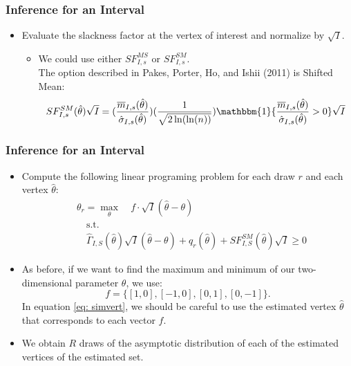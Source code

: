 \begin{frame}
\frametitle{Inference for an Interval}

\begin{itemize}
	\item Evaluate the slackness factor at the vertex of interest and normalize by $\sqrt{I}$.
	\begin{itemize}
		\item We could use either $SF^{MS}_{I,s}$ or $SF^{SM}_{I,s}$.\\
		The option described in Pakes, Porter, Ho, and Ishii (2011) is Shifted Mean:
		\begin{equation*}
		SF^{SM}_{I,s}(\hat{\theta})\sqrt{I} =(\frac{\overline{m}_{I,s}(\hat{\theta})}{\hat{\sigma}_{I,s}(\hat{\theta})})(\frac{1}{\sqrt{2\ln(\ln (n))}})\mathbbm{1}\{\frac{\overline{m}_{I,s}(\hat{\theta})}{\hat{\sigma}_{I,s}(\hat{\theta})}>0\}\sqrt{I}
		\end{equation*}
	\end{itemize}
\end{itemize}
\end{frame}
\begin{frame}
\frametitle{Inference for an Interval}

\begin{itemize}
	\item Compute the following linear programing problem for each draw $r$ and each vertex $\hat{\theta}$:
	\begin{equation}
	\begin{split}
	&\theta_{r}=\max_{\theta}\quad f\cdot\sqrt{I}(\hat{\theta}-\theta)\\
	& \quad \text{s.t.}\\
	& \quad\widehat{\Gamma}_{I,S}(\hat{\theta})\sqrt{I}(\hat{\theta}-\theta)+q_{r}(\hat{\theta})+SF^{SM}_{I,S}(\hat{\theta})\sqrt{I}\geq 0
	\label{eq: simvert}
	\end{split}
	\end{equation}
	\item As before, if we want to find the maximum and minimum of our two-dimensional parameter $\theta$, we use:
	\begin{equation*}
	f=\{[1,0],[-1,0],[0,1],[0,-1]\}.
	\end{equation*}
	In equation \eqref{eq: simvert}, we should be careful to use the estimated vertex $\hat{\theta}$ that corresponds to each vector $f$.
	\item We obtain $R$ draws of the asymptotic distribution of each of the estimated vertices of the estimated set.
\end{itemize}
\end{frame}
